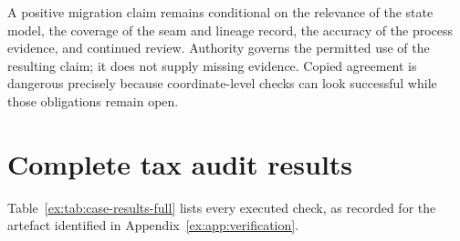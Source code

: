 \documentclass[smallextended,envcountsect,envcountsame,natbib]{svjour3}
\begin{document}
A positive migration claim remains conditional on the relevance of the state model, the coverage of the seam and lineage record, the accuracy of the process evidence, and continued review. Authority governs the permitted use of the resulting claim; it does not supply missing evidence. Copied agreement is dangerous precisely because coordinate-level checks can look successful while those obligations remain open.

\appendix

\section{Complete tax audit results}\label{ex:app:tax-results}
Table~\ref{ex:tab:case-results-full} lists every executed check, as recorded for the artefact identified in Appendix~\ref{ex:app:verification}.
\end{document}
